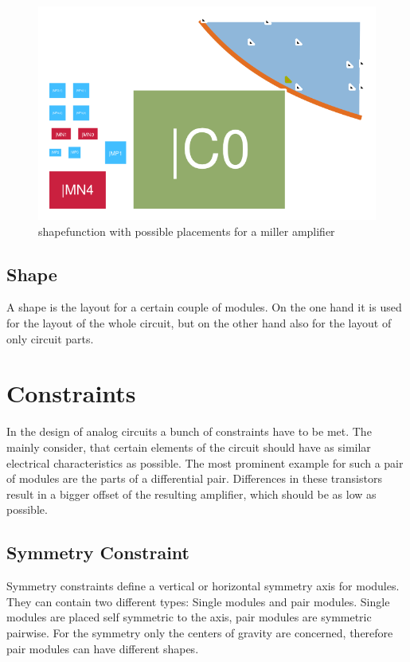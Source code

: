 \begin{figure}
	\centering
	\includegraphics[scale=1.8]{FIG/shapefunction.png}
	\caption{shapefunction with possible placements for a miller amplifier}
	\label{fig:shapefunction}
\end{figure}

\subsection{Shape}
A shape is the layout for a certain couple of modules. On the one hand it is used for the layout of the whole circuit, but on the other hand also for the layout of only circuit parts.

\section{Constraints}
In the design of analog circuits a bunch of constraints have to be met. The mainly consider, that certain elements of the circuit should have as similar electrical characteristics as possible. The most prominent example for such a pair of modules are the parts of a differential pair. Differences in these transistors result in a bigger offset of the resulting amplifier, which should be as low as possible.

\subsection{Symmetry Constraint}
Symmetry constraints define a vertical or horizontal symmetry axis for modules. They can contain two different types: Single modules and pair modules. Single modules are placed self symmetric to the axis, pair modules are symmetric pairwise. For the symmetry only the centers of gravity are concerned, therefore pair modules can have different shapes. 

